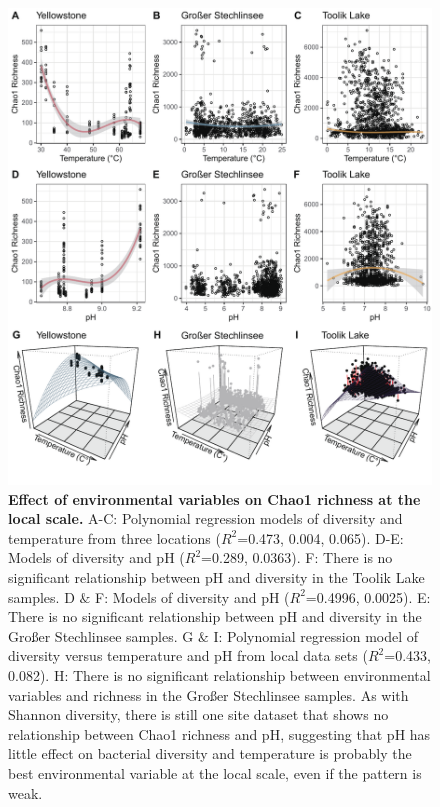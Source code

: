 \begin{figure}[H]
    \centering
    \includegraphics[scale=0.8]{./Figures/Chao_PM_local_1and2EVs_3D}
    \caption{\textbf{Effect of environmental variables on Chao1 richness at the local scale.} A-C: Polynomial regression models of diversity and temperature from three locations ($R^{2}$=0.473, 0.004, 0.065). D-E: Models of diversity and pH ($R^{2}$=0.289, 0.0363). F: There is no significant relationship between pH and diversity in the Toolik Lake samples. D $\&$ F: Models of diversity and pH ($R^{2}$=0.4996, 0.0025). E: There is no significant relationship between pH and diversity in the Großer Stechlinsee samples. G $\&$ I: Polynomial regression model of diversity versus temperature and pH from local data sets ($R^{2}$=0.433, 0.082). H: There is no significant relationship between environmental variables and richness in the Großer Stechlinsee  samples. As with Shannon diversity, there is still one site dataset that shows no relationship between Chao1 richness and pH, suggesting that pH has little effect on bacterial diversity and temperature is probably the best environmental variable at the local scale, even if the pattern is weak.}
    \label{fig:Chao_PM_local_1and2EVs}
\end{figure}

